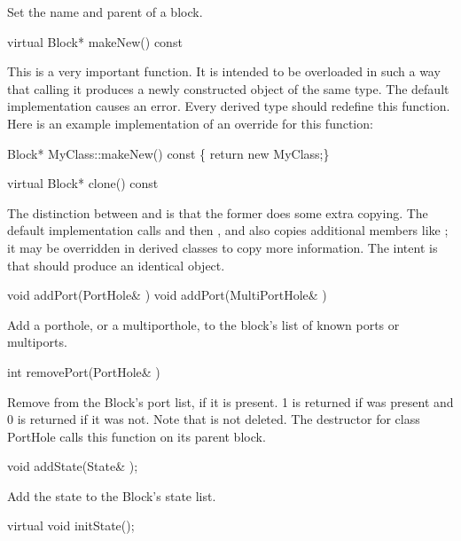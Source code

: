 Set the name and parent of a block.

\begin{example}
virtual Block* makeNew() const
\end{example}

This is a very important function.  It is intended to be overloaded in
such a way that calling it produces a newly constructed object of the
same type.  The default implementation causes an error.  Every derived
type should redefine this function.  Here is an example implementation
of an override for this function:

\begin{example}
Block* MyClass::makeNew() const \{ return new MyClass;\}
\end{example}

\begin{example}
virtual Block* clone() const
\end{example}

The distinction between  and  is that the
former does some extra copying.  The default implementation calls
 and then ,
and also copies additional members like ;
it may be overridden in derived classes to
copy more information.  The intent is that  should produce
an identical object.

\begin{example}
void addPort(PortHole& )
void addPort(MultiPortHole& )
\end{example}

Add a porthole, or a multiporthole, to the block's list of known ports
or multiports.

\begin{example}
int removePort(PortHole& )
\end{example}

Remove  from the Block's port list, if it is present.
1 is returned if  was present and 0 is returned if it
was not.  Note that  is not deleted.  The destructor
for class PortHole calls this function on its parent block.

\begin{example}
void addState(State& );
\end{example}

Add the state  to the Block's state list.

\begin{example}
virtual void initState();
\end{example}

